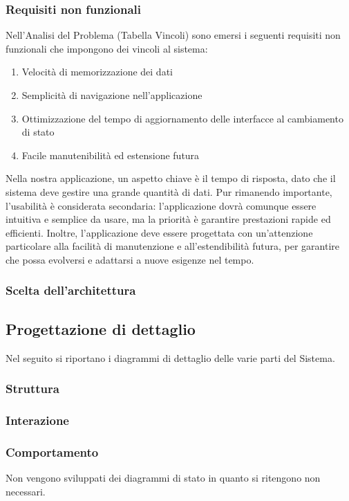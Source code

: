 \documentclass[a4paper, 11pt]{article}
\begin{document}
\subsubsection{Requisiti non funzionali}
Nell’Analisi del Problema (Tabella Vincoli) sono emersi i seguenti requisiti non funzionali che impongono dei vincoli al sistema:

\begin{enumerate}[\indent1.]
    \item Velocità di memorizzazione dei dati
    \item Semplicità di navigazione nell’applicazione
    \item Ottimizzazione del tempo di aggiornamento delle interfacce al cambiamento di stato
    \item Facile manutenibilità ed estensione futura
\end{enumerate}

Nella nostra applicazione, un aspetto chiave è il tempo di risposta, dato che il sistema deve gestire una grande quantità di dati. Pur rimanendo importante, l'usabilità è considerata secondaria: l'applicazione dovrà comunque essere intuitiva e semplice da usare, ma la priorità è garantire prestazioni rapide ed efficienti.
Inoltre, l'applicazione deve essere progettata con un'attenzione particolare alla facilità di manutenzione e all'estendibilità futura, per garantire che possa evolversi e adattarsi a nuove esigenze nel tempo.

\subsubsection{Scelta dell'architettura}

\subsection{Progettazione di dettaglio}
Nel seguito si riportano i diagrammi di dettaglio delle varie parti del Sistema.
\subsubsection{Struttura}
\subsubsection{Interazione}
\subsubsection{Comportamento}
Non vengono sviluppati dei diagrammi di stato in quanto si ritengono non necessari.
\end{document}

